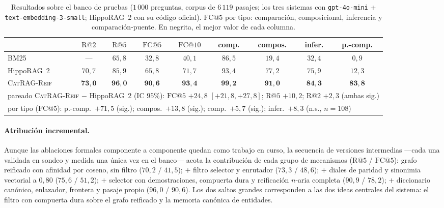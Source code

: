 \documentclass[11pt,a4paper]{article}
\newcommand{\sys}{\textsc{CatRAG-Reif}}          %
\newcommand{\hippo}{HippoRAG~2}
\begin{document}
\begin{table}[t]
\centering\small
\caption{Resultados sobre el banco de pruebas ($1\,000$ preguntas, corpus de
$6\,119$ pasajes; los tres sistemas con \texttt{gpt-4o-mini} +
\texttt{text-embedding-3-small}; \hippo{} con su código oficial).
$\mathrm{FC@}5$ por tipo: comparación, composicional, inferencia y
comparación-puente. En negrita, el mejor valor de cada columna.}
\label{tab:resultados}
\footnotesize\setlength{\tabcolsep}{3.5pt}
\begin{tabular}{lcccccccc}
\toprule
 & $\mathrm{R@}2$ & $\mathrm{R@}5$ & $\mathrm{FC@}5$ & $\mathrm{FC@}10$
 & comp. & compos. & infer. & p.-comp.\\
\midrule
BM25 & --- & $65{,}8$ & $32{,}8$ & $40{,}1$ & $86{,}5$ & $19{,}4$ & $32{,}4$ & $0{,}9$\\
\hippo{} & $70{,}7$ & $85{,}9$ & $65{,}8$ & $71{,}7$ & $93{,}4$ & $77{,}2$ & $75{,}9$ & $12{,}3$\\
\sys{} & $\mathbf{73{,}0}$ & $\mathbf{96{,}0}$ & $\mathbf{90{,}6}$ & $\mathbf{93{,}4}$
       & $\mathbf{99{,}2}$ & $\mathbf{91{,}0}$ & $\mathbf{84{,}3}$ & $\mathbf{83{,}8}$\\
\midrule
\multicolumn{9}{l}{\scriptsize pareado \sys{} $-$ \hippo{} (IC $95\%$):
$\mathrm{FC@}5$ $+24{,}8$ $[+21{,}8, +27{,}8]$;
$\mathrm{R@}5$ $+10{,}2$; $\mathrm{R@}2$ $+2{,}3$ (ambas sig.)}\\
\multicolumn{9}{l}{\scriptsize por tipo ($\mathrm{FC@}5$):
p.-comp.\ $+71{,}5$ (sig.); compos.\ $+13{,}8$ (sig.);
comp.\ $+5{,}7$ (sig.); infer.\ $+8{,}3$ (n.s., $n=108$)}\\
\bottomrule
\end{tabular}
\end{table}

\paragraph{Atribución incremental.}
Aunque las ablaciones formales componente a componente quedan como trabajo
en curso, la secuencia de versiones intermedias ---cada una validada en
sondeo y medida una única vez en el banco--- acota la contribución de cada
grupo de mecanismos ($\mathrm{R@}5$ / $\mathrm{FC@}5$): grafo reificado con
afinidad por coseno, sin filtro ($70{,}2$ / $41{,}5$); $+$ filtro selector
y enrutador ($73{,}3$ / $48{,}6$); $+$ diales de paridad y sinonimia
vectorial a $0{,}80$ ($75{,}6$ / $51{,}2$); $+$ selector con
demostraciones, compuerta dura y reificación $n$-aria completa
($90{,}9$ / $78{,}2$); $+$ diccionario canónico, enlazador, frontera y
pasaje propio ($96{,}0$ / $90{,}6$). Los dos saltos grandes corresponden a
las dos ideas centrales del sistema: el filtro con compuerta dura sobre el
grafo reificado y la memoria canónica de entidades.
\end{document}
